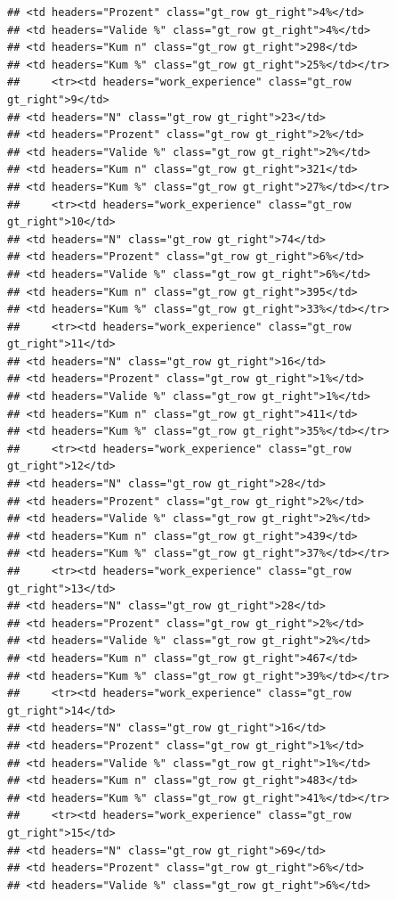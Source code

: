\documentclass[
  a4paper,
  DIV=11,
  numbers=noendperiod]{scrartcl}
\begin{document}
\begin{verbatim}
## <td headers="Prozent" class="gt_row gt_right">4%</td>
## <td headers="Valide %" class="gt_row gt_right">4%</td>
## <td headers="Kum n" class="gt_row gt_right">298</td>
## <td headers="Kum %" class="gt_row gt_right">25%</td></tr>
##     <tr><td headers="work_experience" class="gt_row gt_right">9</td>
## <td headers="N" class="gt_row gt_right">23</td>
## <td headers="Prozent" class="gt_row gt_right">2%</td>
## <td headers="Valide %" class="gt_row gt_right">2%</td>
## <td headers="Kum n" class="gt_row gt_right">321</td>
## <td headers="Kum %" class="gt_row gt_right">27%</td></tr>
##     <tr><td headers="work_experience" class="gt_row gt_right">10</td>
## <td headers="N" class="gt_row gt_right">74</td>
## <td headers="Prozent" class="gt_row gt_right">6%</td>
## <td headers="Valide %" class="gt_row gt_right">6%</td>
## <td headers="Kum n" class="gt_row gt_right">395</td>
## <td headers="Kum %" class="gt_row gt_right">33%</td></tr>
##     <tr><td headers="work_experience" class="gt_row gt_right">11</td>
## <td headers="N" class="gt_row gt_right">16</td>
## <td headers="Prozent" class="gt_row gt_right">1%</td>
## <td headers="Valide %" class="gt_row gt_right">1%</td>
## <td headers="Kum n" class="gt_row gt_right">411</td>
## <td headers="Kum %" class="gt_row gt_right">35%</td></tr>
##     <tr><td headers="work_experience" class="gt_row gt_right">12</td>
## <td headers="N" class="gt_row gt_right">28</td>
## <td headers="Prozent" class="gt_row gt_right">2%</td>
## <td headers="Valide %" class="gt_row gt_right">2%</td>
## <td headers="Kum n" class="gt_row gt_right">439</td>
## <td headers="Kum %" class="gt_row gt_right">37%</td></tr>
##     <tr><td headers="work_experience" class="gt_row gt_right">13</td>
## <td headers="N" class="gt_row gt_right">28</td>
## <td headers="Prozent" class="gt_row gt_right">2%</td>
## <td headers="Valide %" class="gt_row gt_right">2%</td>
## <td headers="Kum n" class="gt_row gt_right">467</td>
## <td headers="Kum %" class="gt_row gt_right">39%</td></tr>
##     <tr><td headers="work_experience" class="gt_row gt_right">14</td>
## <td headers="N" class="gt_row gt_right">16</td>
## <td headers="Prozent" class="gt_row gt_right">1%</td>
## <td headers="Valide %" class="gt_row gt_right">1%</td>
## <td headers="Kum n" class="gt_row gt_right">483</td>
## <td headers="Kum %" class="gt_row gt_right">41%</td></tr>
##     <tr><td headers="work_experience" class="gt_row gt_right">15</td>
## <td headers="N" class="gt_row gt_right">69</td>
## <td headers="Prozent" class="gt_row gt_right">6%</td>
## <td headers="Valide %" class="gt_row gt_right">6%</td>

\end{verbatim}
\end{document}

